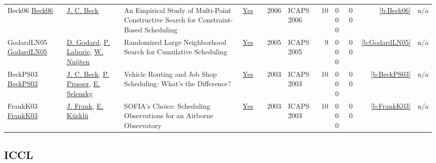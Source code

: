 {\begin{longtable}{>{\raggedright\arraybackslash}p{3cm}>{\raggedright\arraybackslash}p{4.5cm}>{\raggedright\arraybackslash}p{6.0cm}rrrp{2.5cm}rp{1cm}p{1cm}rr}
Beck06 \href{http://www.aaai.org/Library/ICAPS/2006/icaps06-028.php}{Beck06} & \hyperref[auth:a89]{J. C. Beck} & An Empirical Study of Multi-Point Constructive Search for Constraint-Based Scheduling & \href{../works/Beck06.pdf}{Yes} & \cite{Beck06} & 2006 & ICAPS 2006 & 10 & 0 0 0 & 0 0 & \ref{b:Beck06} & n/a\\
GodardLN05 \href{http://www.aaai.org/Library/ICAPS/2005/icaps05-009.php}{GodardLN05} & \hyperref[auth:a774]{D. Godard}, \hyperref[auth:a118]{P. Laborie}, \hyperref[auth:a656]{W. Nuijten} & Randomized Large Neighborhood Search for Cumulative Scheduling & \href{../works/GodardLN05.pdf}{Yes} & \cite{GodardLN05} & 2005 & ICAPS 2005 & 9 & 0 0 0 & 0 0 & \ref{b:GodardLN05} & n/a\\
BeckPS03 \href{http://www.aaai.org/Library/ICAPS/2003/icaps03-027.php}{BeckPS03} & \hyperref[auth:a89]{J. C. Beck}, \hyperref[auth:a827]{P. Prosser}, \hyperref[auth:a828]{E. Selensky} & Vehicle Routing and Job Shop Scheduling: What's the Difference? & \href{../works/BeckPS03.pdf}{Yes} & \cite{BeckPS03} & 2003 & ICAPS 2003 & 10 & 0 0 0 & 0 0 & \ref{b:BeckPS03} & n/a\\
FrankK03 \href{http://www.aaai.org/Library/ICAPS/2003/icaps03-023.php}{FrankK03} & \hyperref[auth:a379]{J. Frank}, \hyperref[auth:a380]{E. K{\"{u}}rkl{\"{u}}} & SOFIA's Choice: Scheduling Observations for an Airborne Observatory & \href{../works/FrankK03.pdf}{Yes} & \cite{FrankK03} & 2003 & ICAPS 2003 & 10 & 0 0 0 & 0 0 & \ref{b:FrankK03} & n/a\\
\end{longtable}
}

\subsection{ICCL}

